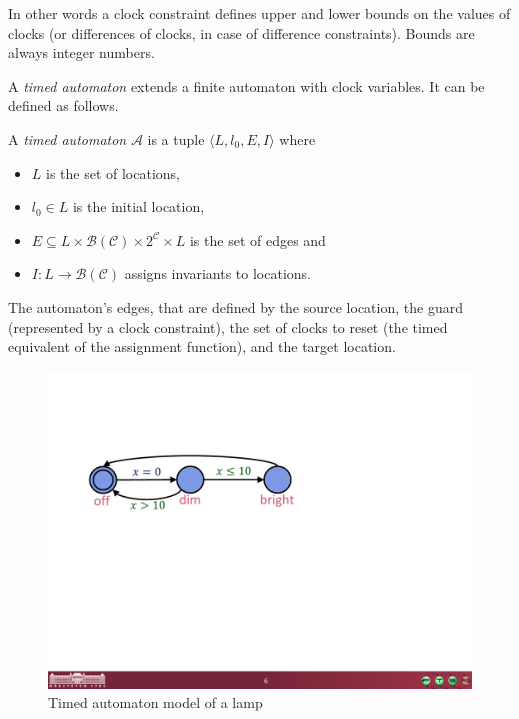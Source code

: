In other words a clock constraint defines upper and lower bounds on the values of clocks (or differences of clocks, in case of difference constraints). Bounds are always integer numbers.

A \emph{timed automaton} extends a finite automaton with clock variables. It can be defined as follows.

\begin{dfn}
A \emph{timed automaton} $\mathcal{A}$ is a tuple $\langle L, l_0,
E, I\rangle$ where
\begin{itemize}
	\item $L$ is the set of locations,
	\item $l_0 \in L$ is the initial location,
	\item $E \subseteq L \times \mathcal{B}(\mathcal{C}) \times 2^\mathcal{C} \times L$ is the set of edges and
	\item $I: L \to \mathcal{B}(\mathcal{C})$ assigns invariants to locations. \cite{bengtsson2004timed}
\end{itemize}
\end{dfn}

The automaton's edges, that are defined by the source location, the guard (represented by a clock constraint), the set of clocks to reset (the timed equivalent of the assignment function), and the target location.

\begin{figure}
	\centering
	\begin{minipage}{0.5\textwidth}
		\includegraphics[width=\textwidth]{include/figures/timed_lamp}%
		\caption{Timed automaton model of a lamp}
		\label{fig:lamp}
	\end{minipage}
\end{figure}

